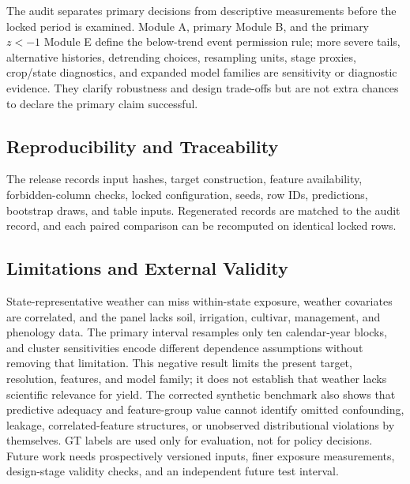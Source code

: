 \documentclass[conference]{IEEEtran}
\begin{document}
The audit separates primary decisions from descriptive measurements before the
locked period is examined. Module A, primary Module B, and the primary $z<-1$
Module E define the below-trend event permission rule; more severe tails,
alternative histories, detrending choices, resampling units, stage proxies,
crop/state diagnostics, and expanded model families are sensitivity or diagnostic
evidence. They clarify robustness and design trade-offs but are not extra chances
to declare the primary claim successful.

\subsection{Reproducibility and Traceability}
The release records input hashes, target construction, feature availability,
forbidden-column checks, locked configuration, seeds, row IDs, predictions,
bootstrap draws, and table inputs. Regenerated records are matched to the audit
record, and each paired comparison can be recomputed on identical locked rows.

\subsection{Limitations and External Validity}
State-representative weather can miss within-state exposure, weather covariates
are correlated, and the panel lacks soil, irrigation, cultivar, management, and
phenology data. The primary interval resamples only ten calendar-year blocks, and
cluster sensitivities encode different dependence assumptions without removing
that limitation. This negative result limits the present target, resolution,
features, and model family; it does not establish that weather lacks scientific
relevance for yield. The corrected synthetic benchmark also shows that predictive
adequacy and feature-group value cannot identify omitted confounding, leakage,
correlated-feature structures, or unobserved distributional violations by
themselves. GT labels are used only for evaluation, not for policy decisions.
Future work needs prospectively versioned inputs, finer exposure measurements,
design-stage validity checks, and an independent future test interval.
\end{document}
